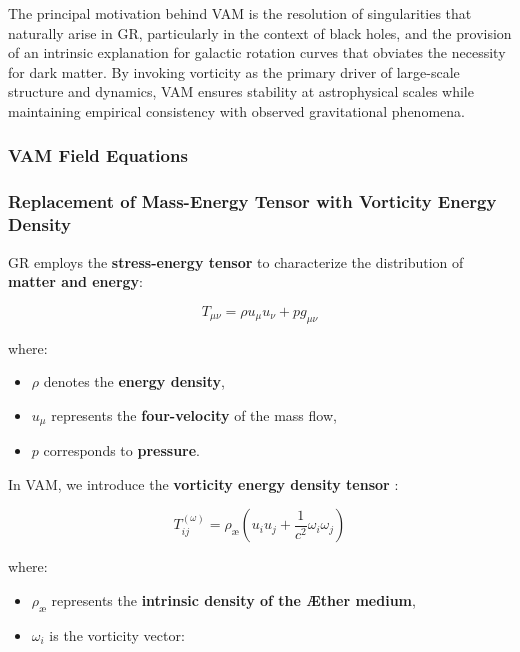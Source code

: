 \documentclass[a4paper,10pt]{article}
\begin{document}
The principal motivation behind VAM is the resolution of singularities that naturally arise in GR, particularly in the context of black holes, and the provision of an intrinsic explanation for galactic rotation curves that obviates the necessity for dark matter. By invoking vorticity as the primary driver of large-scale structure and dynamics, VAM ensures stability at astrophysical scales while maintaining empirical consistency with observed gravitational phenomena.

\subsubsection*{VAM Field Equations}


\subsubsection*{Replacement of Mass-Energy Tensor with Vorticity Energy Density}
GR employs the \textbf{stress-energy tensor} to characterize the distribution of \textbf{matter and energy}:

\begin{equation*}
    T_{\mu\nu} = \rho u_\mu u_\nu + p g_{\mu\nu}
\end{equation*}

where:
\begin{itemize}
    \item $\rho$ denotes the \textbf{energy density},
    \item $u_\mu$ represents the \textbf{four-velocity} of the mass flow,
    \item $p$ corresponds to \textbf{pressure}.
\end{itemize}

In VAM, we introduce the \textbf{vorticity energy density tensor} \cite{thomson_vortex}:



\begin{equation*}
    T^{(\omega)}_{ij} = \rho_\text{\ae} \left( u_i u_j + \frac{1}{c^2} \omega_i \omega_j \right)
\end{equation*}


where:
\begin{itemize}
    \item $\rho_\text{\ae}$ represents the \textbf{intrinsic density of the Æther medium},
    \item $\omega_i$ is the vorticity vector:
\end{itemize}
\end{document}
